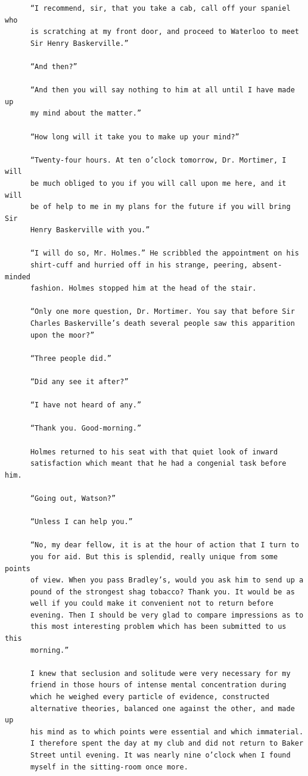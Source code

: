 \documentclass{article}
\begin{document}
\begin{verbatim}
      “I recommend, sir, that you take a cab, call off your spaniel who
      is scratching at my front door, and proceed to Waterloo to meet
      Sir Henry Baskerville.”

      “And then?”

      “And then you will say nothing to him at all until I have made up
      my mind about the matter.”

      “How long will it take you to make up your mind?”

      “Twenty-four hours. At ten o’clock tomorrow, Dr. Mortimer, I will
      be much obliged to you if you will call upon me here, and it will
      be of help to me in my plans for the future if you will bring Sir
      Henry Baskerville with you.”

      “I will do so, Mr. Holmes.” He scribbled the appointment on his
      shirt-cuff and hurried off in his strange, peering, absent-minded
      fashion. Holmes stopped him at the head of the stair.

      “Only one more question, Dr. Mortimer. You say that before Sir
      Charles Baskerville’s death several people saw this apparition
      upon the moor?”

      “Three people did.”

      “Did any see it after?”

      “I have not heard of any.”

      “Thank you. Good-morning.”

      Holmes returned to his seat with that quiet look of inward
      satisfaction which meant that he had a congenial task before him.

      “Going out, Watson?”

      “Unless I can help you.”

      “No, my dear fellow, it is at the hour of action that I turn to
      you for aid. But this is splendid, really unique from some points
      of view. When you pass Bradley’s, would you ask him to send up a
      pound of the strongest shag tobacco? Thank you. It would be as
      well if you could make it convenient not to return before
      evening. Then I should be very glad to compare impressions as to
      this most interesting problem which has been submitted to us this
      morning.”

      I knew that seclusion and solitude were very necessary for my
      friend in those hours of intense mental concentration during
      which he weighed every particle of evidence, constructed
      alternative theories, balanced one against the other, and made up
      his mind as to which points were essential and which immaterial.
      I therefore spent the day at my club and did not return to Baker
      Street until evening. It was nearly nine o’clock when I found
      myself in the sitting-room once more.


\end{verbatim}
\end{document}
